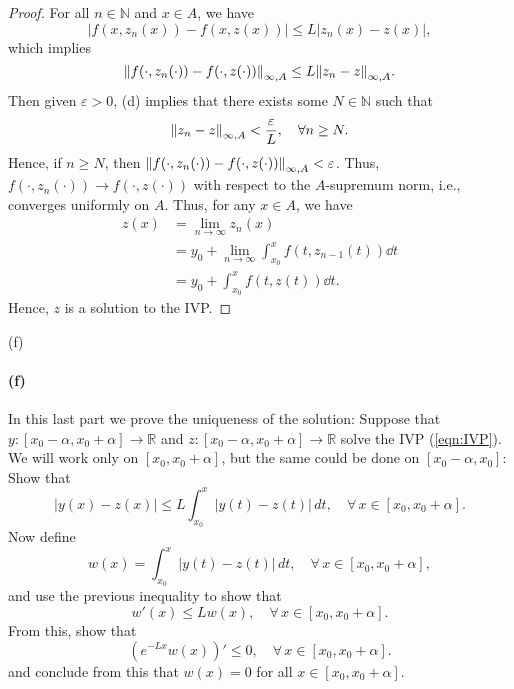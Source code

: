 \documentclass[12pt]{article}
\newenvironment{fullbox}{\begin{lrbox}{\savefullbox}\begin{minipage}{\dimexpr\textwidth-2\fboxsep\relax}}{\end{minipage}\end{lrbox}\begin{center}\framebox[\textwidth]{\usebox{\savefullbox}}\end{center}}
\newenvironment{pbox}[1][]{\begin{fullbox}\ifx#1\empty\else\paragraph{#1}\fi}{\end{fullbox}}
\theoremstyle{definition}
\newcommand{\N}{\mathbb{N}}
\newcommand{\R}{\mathbb{R}}
\newcommand{\eps}{\varepsilon}
\begin{document}
\begin{proof}
    For all $n \in \N$ and $x \in A$, we have
    \[
        |f(x, z_n(x)) - f(x, z(x))| \leq L|z_n(x) - z(x)|,
    \]
    which implies
    \[
        \norm{f(\cdot, z_n(\cdot)) - f(\cdot, z(\cdot))}_{\infty, A} \leq L\norm{z_n - z}_{\infty, A}.
    \]
    Then given $\eps > 0$, (d) implies that there exists some $N \in \N$ such that
    \[
        \norm{z_n - z}_{\infty, A} < \frac{\eps}{L}, \quad \forall n \geq N.
    \]
    Hence, if $n \geq N$, then $\norm{f(\cdot, z_n(\cdot)) - f(\cdot, z(\cdot))}_{\infty, A} < \eps$. Thus, $f(\cdot,z_n(\cdot)) \to f(\cdot, z(\cdot))$ with respect to the $A$-supremum norm, i.e., converges uniformly on $A$. Thus, for any $x \in A$, we have
    \begin{align*}
        z(x)
            &= \lim_{n \to \infty} z_n(x) \\
            &= y_0 + \lim_{n \to \infty} \int_{x_0}^{x} f(t, z_{n-1}(t)) \dd{t} \\
            &= y_0 + \int_{x_0}^{x} f(t, z(t)) \dd{t}.
    \end{align*}
    Hence, $z$ is a solution to the IVP.
    
\end{proof}



\newpage
\begin{pbox}[(f)]
    In this last part we prove the uniqueness of the solution: Suppose that $y:[x_0-\alpha,x_0+\alpha]\to \R$ and $z:[x_0-\alpha,x_0+\alpha]\to \R$ solve the IVP (\ref{eqn:IVP}). We will work only on $[x_0,x_0+\alpha]$, but the same could be done on $[x_0-\alpha,x_0]$: Show that 
    \begin{equation}
    |y(x)-z(x)|\le L\int_{x_0}^x |y(t)-z(t)|\,dt,\quad \forall\,x\in [x_0,x_0+\alpha].
    \end{equation}
    Now define 
    \begin{equation}
    w(x) = \int_{x_0}^x |y(t)-z(t)|\,dt,\quad \forall\,x\in [x_0,x_0+\alpha],
    \end{equation}
    and use the previous inequality to show that 
    \begin{equation}
    w'(x) \le Lw(x), \quad \forall\,x\in [x_0,x_0+\alpha].
    \end{equation}
    From this, show that 
    \begin{equation}
    \left (e^{-Lx} w(x)\right )' \le 0,\quad \forall\,x\in [x_0,x_0+\alpha].
    \end{equation}
    and conclude from this that $w(x) = 0$ for all $x \in [x_0,x_0+\alpha]$.
\end{pbox}
\end{document}
